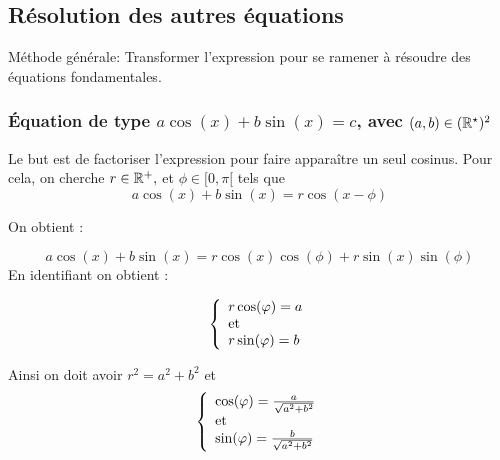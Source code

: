 \documentclass[a4paper, 11pt]{article}
\begin{document}
\vspace*{0.5cm}



\pagebreak

\subsection{R\'esolution des autres \'equations}

%

M\'ethode g\'en\'erale:
Transformer l'expression pour se ramener \`{a} r\'esoudre des \'equations fondamentales.\\


\vspace{0.4cm}
\subsubsection{\'Equation de type $a\cos{(x)}+b\sin{(x)}=c$, avec $(a,b) \in (\R^\star)^2$}

Le but est de factoriser l'expression pour faire appara\^itre un seul cosinus. Pour cela, on cherche $r\in \R^+,$ et $\phi \in [0,\pi[$ tels que  
$$a\cos{(x)}+b\sin{(x)}=r\cos(x-\phi)$$

On obtient : 

$$a\cos{(x)}+b\sin{(x)} = r \cos(x) \cos(\phi) + r\sin(x) \sin(\phi)$$
En identifiant on obtient : 

$$
\left\{ \begin{array}{l}
r\cos(\phi) = a\\
\textmd{et}\\
r\sin(\phi) = b
\end{array}\right.$$


Ainsi on doit avoir $r^2 =a^2+b^2$ et
$$
\left\{ \begin{array}{l}
\cos(\phi) = \frac{a}{\sqrt{a^2+b^2}}\\
\textmd{et}\\
\sin(\phi) = \frac{b}{\sqrt{a^2+b^2}}
\end{array}\right.$$
\end{document}

